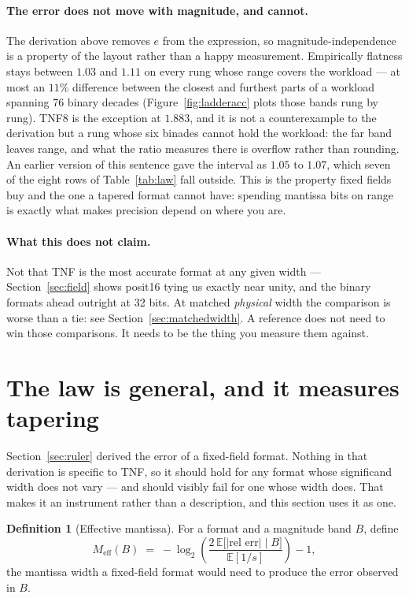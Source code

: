 \documentclass[11pt]{article}
\theoremstyle{definition}
\newtheorem{definition}{Definition}
\begin{document}
\paragraph{The error does not move with magnitude, and cannot.} The derivation
above removes $e$ from the expression, so magnitude-independence is a property of
the layout rather than a happy measurement. Empirically flatness stays between
$1.03$ and $1.11$ on every rung whose range covers the workload --- at most an
$11\%$ difference between the closest and furthest parts of a workload spanning
76 binary decades (Figure~\ref{fig:ladderacc} plots those bands rung by rung).
TNF8 is the exception at $1.883$, and it is not a counterexample to the
derivation but a rung whose six binades cannot hold the workload: the far band
leaves range, and what the ratio measures there is overflow rather than rounding.
An earlier version of this sentence gave the interval as $1.05$ to $1.07$, which
seven of the eight rows of Table~\ref{tab:law} fall outside. This is the property fixed fields
buy and the one a tapered format cannot have: spending mantissa bits on range is
exactly what makes precision depend on where you are.

\paragraph{What this does not claim.} Not that TNF is the most accurate format
at any given width --- Section~\ref{sec:field} shows posit16 tying us exactly
near unity, and the binary formats ahead outright at 32 bits. At matched
\emph{physical} width the comparison is worse than a tie: see
Section~\ref{sec:matchedwidth}. A reference does not need to win those comparisons. It needs to be the
thing you measure them against.


\section{The law is general, and it measures tapering}\label{sec:law}

Section~\ref{sec:ruler} derived the error of a fixed-field format. Nothing in that
derivation is specific to TNF, so it should hold for any format whose significand
width does not vary --- and should visibly fail for one whose width does. That
makes it an instrument rather than a description, and this section uses it as one.

\begin{definition}[Effective mantissa]
For a format and a magnitude band $B$, define
\[
  M_{\mathrm{eff}}(B) \;=\; -\log_2\!\left(\frac{2\,\mathbb{E}\bigl[|\text{rel err}|\;\big|\;B\bigr]}{\mathbb{E}[1/s]}\right) - 1 ,
\]
the mantissa width a fixed-field format would need to produce the error observed
in $B$.
\end{definition}
\end{document}
